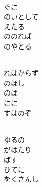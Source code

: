 \documentclass[10pt,b5j]{tarticle} %
\begin{document}
\vspace{1.5em} %
\newcommand{\linespace}{0.5em} %
\newcommand{\blocksize}{0.5\hsize} %
\newcommand{\itemmargin}{3em} %
\begin{enumerate} %
    \setlength{\itemindent}{\itemmargin} %
    \begin{minipage}[c]{\blocksize}
    
        \vspace{\linespace}
        \item~\\
        ぐに\\
        のいとして\\
        えたる\\
        ののれば\\
        のやとる
        
    \end{minipage}
    \begin{minipage}[c]{\blocksize}
        
        \vspace{\linespace}
        \item~\\
        れはからず\\
        のほし\\
        のは\\
        にに\\
        すはのぞ
        
    \end{minipage}
    \begin{minipage}[c]{\blocksize}
        
        \vspace{\linespace}
        \item~\\
        ゆるの\\
        がはたり\\
        ばす\\
        ひてに\\
        をくさんし
    
    \end{minipage}
\end{enumerate} %
\end{document}
